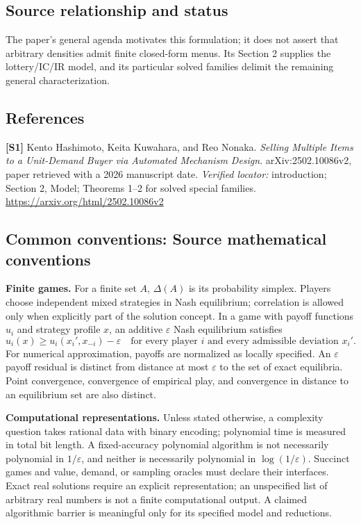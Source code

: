 \documentclass[11pt,a4paper]{article}
\begin{document}
\subsection*{Source relationship and status}
The paper's general agenda motivates this formulation; it does not assert that arbitrary densities admit finite closed-form menus. Its Section 2 supplies the lottery/IC/IR model, and its particular solved families delimit the remaining general characterization.
\subsection*{References}
\begingroup\footnotesize\raggedright
\textbf{[S1]} Kento Hashimoto, Keita Kuwahara, and Reo Nonaka. \emph{Selling Multiple Items to a Unit-Demand Buyer via Automated Mechanism Design}. arXiv:2502.10086v2, paper retrieved with a 2026 manuscript date. \textit{Verified locator:} introduction; Section 2, Model; Theorems 1--2 for solved special families. \url{https://arxiv.org/html/2502.10086v2}
\par\endgroup

\subsection*{Common conventions: Source mathematical conventions}

\textbf{Finite games.} For a finite set $A$, $\Delta(A)$ is its probability
simplex. Players choose independent mixed strategies in Nash equilibrium;
correlation is allowed only when explicitly part of the solution concept.
In a game with payoff functions $u_i$ and strategy profile $x$, an additive
$\varepsilon$ Nash equilibrium satisfies
\[
 u_i(x)\geq u_i(x_i',x_{-i})-\varepsilon
 \quad\text{for every player $i$ and every admissible deviation $x_i'$}.
\]
For numerical approximation, payoffs are normalized as locally specified.
An $\varepsilon$ payoff residual is distinct from distance at most
$\varepsilon$ to the set of exact equilibria. Point convergence, convergence
of empirical play, and convergence in distance to an equilibrium set are
also distinct.

\textbf{Computational representations.} Unless stated otherwise, a complexity
question takes rational data with binary encoding; polynomial time is measured
in total bit length. A fixed-accuracy polynomial algorithm is not necessarily
polynomial in $1/\varepsilon$, and neither is necessarily polynomial in
$\log(1/\varepsilon)$. Succinct games and value, demand, or sampling oracles
must declare their interfaces. Exact real solutions require an explicit
representation; an unspecified list of arbitrary real numbers is not a
finite computational output. A claimed algorithmic barrier is meaningful
only for its specified model and reductions.
\end{document}
